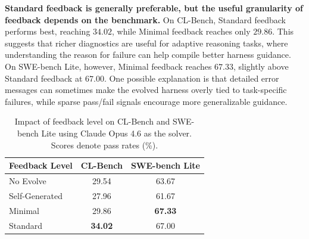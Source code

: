 \textbf{Standard feedback is generally preferable, but the useful granularity of feedback depends on the benchmark.}
On CL-Bench, Standard feedback performs best, reaching $34.02$, while Minimal feedback reaches only $29.86$. This suggests that richer diagnostics are useful for adaptive reasoning tasks, where understanding the reason for failure can help compile better harness guidance. On SWE-bench Lite, however, Minimal feedback reaches $67.33$, slightly above Standard feedback at $67.00$. One possible explanation is that detailed error messages can sometimes make the evolved harness overly tied to task-specific failures, while sparse pass/fail signals encourage more generalizable guidance.



\begin{table}[t]
\centering
\caption{Impact of feedback level on CL-Bench and SWE-bench Lite using Claude Opus 4.6 as the solver. Scores denote pass rates (\%).}
\label{tab:feedback-level-ablation}
\vspace{3pt}
\small
\begin{tabular}{lcc}
\toprule
\textbf{Feedback Level} & \textbf{CL-Bench} & \textbf{SWE-bench Lite} \\
\midrule
No Evolve & 29.54 & 63.67 \\
Self-Generated & 27.96 & 61.67 \\
Minimal & 29.86 & \textbf{67.33} \\
Standard & \textbf{34.02} & 67.00 \\
\bottomrule
\end{tabular}
\vspace{-5pt}
\end{table}







